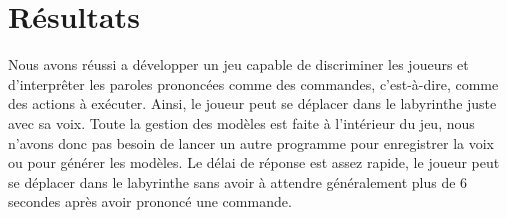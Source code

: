 \section{Résultats}
\label{sec:resultats}

Nous avons réussi a développer un jeu capable de discriminer les joueurs et d'interprêter les paroles prononcées comme des commandes, c'est-à-dire, comme des actions à exécuter.
Ainsi, le joueur peut se déplacer dans le labyrinthe juste avec sa voix. Toute la gestion des modèles est faite à l'intérieur du jeu,
nous n'avons donc pas besoin de lancer un autre programme pour enregistrer la voix ou pour générer les modèles.
Le délai de réponse est assez rapide, le joueur peut se déplacer dans le labyrinthe sans avoir à attendre généralement plus de 6 secondes
après avoir prononcé une commande.

